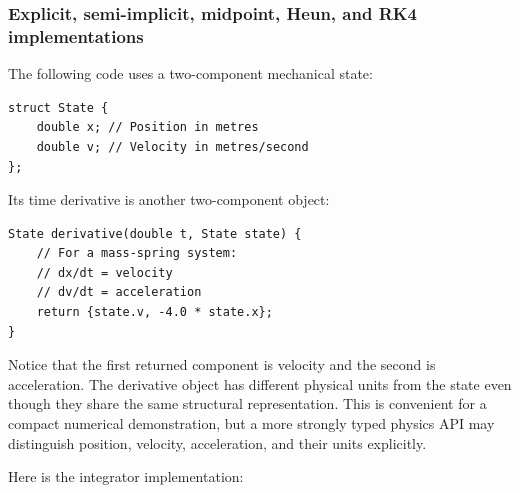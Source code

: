 \subsubsection{Explicit, semi-implicit, midpoint, Heun, and RK4 implementations}\label{02-foundations-ii-ch025-explicit-semi-implicit-midpoint-heun-and-rk4-implementations}

The following code uses a two-component mechanical state:

\begin{verbatim}
struct State {
    double x; // Position in metres
    double v; // Velocity in metres/second
};
\end{verbatim}

Its time derivative is another two-component object:

\begin{verbatim}
State derivative(double t, State state) {
    // For a mass-spring system:
    // dx/dt = velocity
    // dv/dt = acceleration
    return {state.v, -4.0 * state.x};
}
\end{verbatim}

Notice that the first returned component is velocity and the second is acceleration. The derivative object has different physical units from the state even though they share the same structural representation. This is convenient for a compact numerical demonstration, but a more strongly typed physics API may distinguish position, velocity, acceleration, and their units explicitly.

Here is the integrator implementation:


